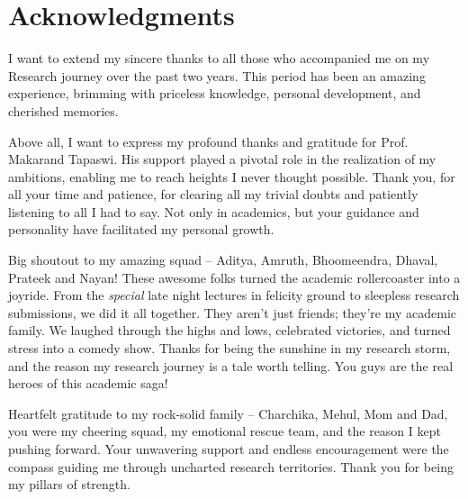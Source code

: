 \chapter*{Acknowledgments}
\label{ch:ack}
I want to extend my sincere thanks to all those who accompanied me on my Research journey over the past two years. This period has been an amazing experience, brimming with priceless knowledge, personal development, and cherished memories.

Above all, I want to express my profound thanks and gratitude for Prof. Makarand Tapaswi. His support played a pivotal role in the realization of my ambitions, enabling me to reach heights I never thought possible. Thank you, for all your time and patience, for clearing all my trivial doubts and patiently listening to all I had to say. Not only in academics, but your guidance and personality have facilitated my personal growth.

Big shoutout to my amazing squad – Aditya, Amruth, Bhoomeendra, Dhaval, Prateek and Nayan! These awesome folks turned the academic rollercoaster into a joyride. From the \emph{special} late night lectures in felicity ground to sleepless research submissions, we did it all together. They aren't just friends; they're my academic family. We laughed through the highs and lows, celebrated victories, and turned stress into a comedy show. Thanks for being the sunshine in my research storm, and the reason my research journey is a tale worth telling. You guys are the real heroes of this academic saga!

Heartfelt gratitude to my rock-solid family -- Charchika, Mehul, Mom and Dad, you were my cheering squad, my emotional rescue team, and the reason I kept pushing forward. Your unwavering support and endless encouragement were the compass guiding me through uncharted research territories. Thank you for being my pillars of strength.
